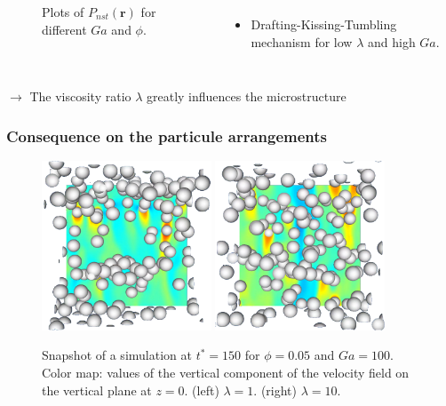 \documentclass{sintefbeamer}
\begin{document}
\begin{frame}
\begin{columns}
      \begin{figure}
        \caption{Plots of $P_{nst} (\textbf{r})$ for different $Ga$ and $\phi$.}
      \end{figure}
    
    \begin{itemize}
      \item Drafting-Kissing-Tumbling mechanism for low $\lambda$ and high $Ga$. 
    \end{itemize}
  \end{columns}
  $\to$ The viscosity ratio $\lambda$ greatly influences the microstructure
\end{frame}

\begin{frame}
  \frametitle{Consequence on the particule arrangements}

  \begin{figure}[h!]
    \centering
    \includegraphics[width=0.45\textwidth]{image/HOMOGENEOUS_NEW/P_PHI_5_l_10_Ga_100.png}
    \includegraphics[width=0.45\textwidth]{image/HOMOGENEOUS_NEW/P_PHI_5_l_1_Ga_100.png}
    \caption{Snapshot of a simulation at $t^* = 150$ for $\phi=0.05$ and $Ga=100$.
      Color map: values of the vertical component of the velocity field on the vertical plane at $z=0$.
      \break
    (left)  $\lambda = 1$.
    (right)  $\lambda = 10$.
    }
    \label{fig:images}
 \end{figure}

\end{frame}
\end{document}

